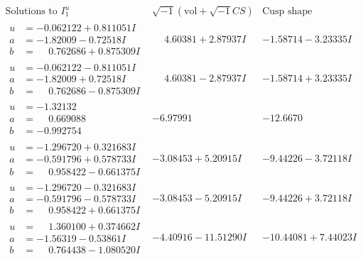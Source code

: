 \documentclass[1p]{elsarticle_modified}
\theoremstyle{definition}
\newcommand{\I}{\sqrt{-1}}
\begin{document}
$$\begin{array}{c|c|c}  
\text{Solutions to }I^u_{1}& \I (\text{vol} + \sqrt{-1}CS) & \text{Cusp shape}\\
 \hline 
\begin{aligned}
u &= -0.062122 + 0.811051 I \\
a &= -1.82009 - 0.72518 I \\
b &= \phantom{-}0.762686 + 0.875309 I\end{aligned}
 & \phantom{-}4.60381 + 2.87937 I & -1.58714 - 3.23335 I \\ \hline\begin{aligned}
u &= -0.062122 - 0.811051 I \\
a &= -1.82009 + 0.72518 I \\
b &= \phantom{-}0.762686 - 0.875309 I\end{aligned}
 & \phantom{-}4.60381 - 2.87937 I & -1.58714 + 3.23335 I \\ \hline\begin{aligned}
u &= -1.32132\phantom{ +0.000000I} \\
a &= \phantom{-}0.669088\phantom{ +0.000000I} \\
b &= -0.992754\phantom{ +0.000000I}\end{aligned}
 & -6.97991\phantom{ +0.000000I} & -12.6670\phantom{ +0.000000I} \\ \hline\begin{aligned}
u &= -1.296720 + 0.321683 I \\
a &= -0.591796 + 0.578733 I \\
b &= \phantom{-}0.958422 - 0.661375 I\end{aligned}
 & -3.08453 + 5.20915 I & -9.44226 - 3.72118 I \\ \hline\begin{aligned}
u &= -1.296720 - 0.321683 I \\
a &= -0.591796 - 0.578733 I \\
b &= \phantom{-}0.958422 + 0.661375 I\end{aligned}
 & -3.08453 - 5.20915 I & -9.44226 + 3.72118 I \\ \hline\begin{aligned}
u &= \phantom{-}1.360100 + 0.374662 I \\
a &= -1.56319 - 0.53861 I \\
b &= \phantom{-}0.764438 - 1.080520 I\end{aligned}
 & -4.40916 - 11.51290 I & -10.44081 + 7.44023 I \\ \hline\begin{aligned}

\end{aligned}
\end{array}$$
\end{document}
